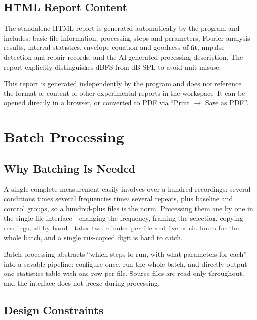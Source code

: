 \documentclass[UTF8,a4paper,12pt]{ctexart}
\begin{document}
\subsection{HTML Report Content}

The standalone HTML report is generated automatically by the program and includes: basic file information, processing steps and parameters, Fourier analysis results, interval statistics, envelope equation and goodness of fit, impulse detection and repair records, and the AI-generated processing description. The report explicitly distinguishes dBFS from dB SPL to avoid unit misuse.

This report is generated independently by the program and does not reference the format or content of other experimental reports in the workspace. It can be opened directly in a browser, or converted to PDF via ``Print $\to$ Save as PDF''.

\section{Batch Processing}

\subsection{Why Batching Is Needed}

A single complete measurement easily involves over a hundred recordings: several conditions times several frequencies times several repeats, plus baseline and control groups, so a hundred-plus files is the norm. Processing them one by one in the single-file interface---changing the frequency, framing the selection, copying readings, all by hand---takes two minutes per file and five or six hours for the whole batch, and a single mis-copied digit is hard to catch.

Batch processing abstracts ``which steps to run, with what parameters for each'' into a savable pipeline: configure once, run the whole batch, and directly output one statistics table with one row per file. Source files are read-only throughout, and the interface does not freeze during processing.

\subsection{Design Constraints}
\end{document}
